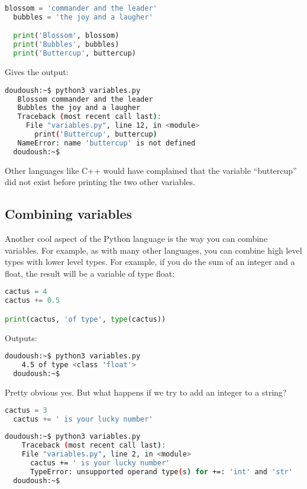 \begin{lstlisting}[language=python]
  blossom = 'commander and the leader'
  bubbles = 'the joy and a laugher'

  print('Blossom', blossom)
  print('Bubbles', bubbles)
  print('Buttercup', buttercup)
\end{lstlisting}

Gives the output:

\begin{lstlisting}[language=bash]
  doudoush:~$ python3 variables.py
   Blossom commander and the leader
   Bubbles the joy and a laugher
   Traceback (most recent call last):
     File "variables.py", line 12, in <module>
       print('Buttercup', buttercup)
   NameError: name 'buttercup' is not defined
  doudoush:~$
\end{lstlisting}

Other languages like C++ would have complained that the variable ``buttercup''
did not exist before printing the two other variables.

\subsection{Combining variables}

Another cool aspect of the Python language is the way you can combine variables.
For example, as with many other languages, you can combine high level types with
lower level types. For example, if you do the sum of an integer and a float,
the result will be a variable of type float:

\begin{lstlisting}[language=python]
cactus = 4
cactus += 0.5

print(cactus, 'of type', type(cactus))
\end{lstlisting}

Outputs:

\begin{lstlisting}[language=bash]
  doudoush:~$ python3 variables.py
    4.5 of type <class 'float'>
  doudoush:~$
\end{lstlisting}

Pretty obvious yes. But what happens if we try to add an integer to a string?

\begin{lstlisting}[language=python]
  cactus = 3
  cactus += ' is your lucky number'
\end{lstlisting}

\begin{lstlisting}[language=bash]
  doudoush:~$ python3 variables.py
    Traceback (most recent call last):
    File "variables.py", line 2, in <module>
      cactus += ' is your lucky number'
      TypeError: unsupported operand type(s) for +=: 'int' and 'str'
  doudoush:~$
\end{lstlisting}

